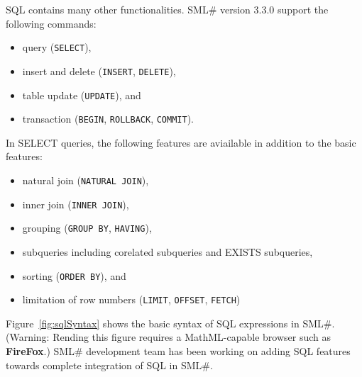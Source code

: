\documentclass{jbook}
\newcommand{\smlsharp}{SML\#}
\newcommand{\version}{3.3.0}
\begin{document}
\else%
	SQL contains many other functionalities.
	\smlsharp{} version \version{} support the following commands:
\begin{itemize}
\item query ({\tt SELECT}),
\item insert and delete ({\tt INSERT}, {\tt DELETE}),
\item table update ({\tt UPDATE}), and
\item transaction ({\tt BEGIN}, {\tt ROLLBACK}, {\tt COMMIT}).
\end{itemize}
	In SELECT queries,
the following features are aviailable in addition to the basic features:
\begin{itemize}
\item natural join ({\tt NATURAL JOIN}),
\item inner join ({\tt INNER JOIN}),
\item grouping ({\tt GROUP BY}, {\tt HAVING}),
\item subqueries including corelated subqueries and EXISTS subqueries,
\item sorting ({\tt ORDER BY}), and
\item limitation of row numbers ({\tt LIMIT}, {\tt OFFSET}, {\tt FETCH})
\end{itemize}

	Figure~\ref{fig:sqlSyntax} shows the basic syntax of
SQL expressions in \smlsharp{}.
	(Warning: Rending this figure requires a MathML-capable browser such as {\bf FireFox}.)
	\smlsharp{} development team has been working on
adding SQL features towards complete integration of SQL in \smlsharp{}.
\fi%
\end{document}
